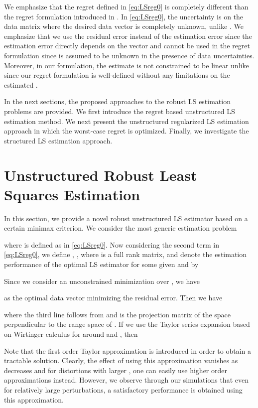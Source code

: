 \documentclass[review,sort&compress]{elsarticle}
\begin{document}
We emphasize that the regret defined in \eqref{eq:LSreg0} is completely different than the regret formulation introduced in \cite{yonina1, yonina3}. In \eqref{eq:LSreg0}, the uncertainty is on the data matrix where the desired data vector  is completely unknown, unlike \cite{yonina1, yonina3}. We emphasize that we use the residual error  instead of the estimation error  since the estimation error directly depends on the vector  and cannot be used in the regret formulation since  is assumed to be unknown in the presence of data uncertainties. Moreover, in our formulation, the estimate  is not constrained to be linear unlike \cite{yonina1, yonina3} since our regret formulation is well-defined without any limitations on the estimated .

In the next sections, the proposed approaches to the robust LS estimation problems are provided. We first introduce the regret based unstructured LS estimation method. We next present the unstructured regularized LS estimation approach in which the worst-case regret is optimized. Finally, we investigate the structured LS estimation approach.

\section{Unstructured Robust Least Squares Estimation} \label{sec:urls}
In this section, we provide a novel robust unstructured LS estimator based on a certain minimax criterion. We consider the most generic estimation problem

where  is defined as in \eqref{eq:LSreg0}. Now considering the second term in \eqref{eq:LSreg0}, we define , , where  is a full rank matrix, and denote the estimation performance of the optimal LS estimator for some given  and  by

Since we consider an unconstrained minimization over , we have \cite{sayedbook}

as the optimal data vector minimizing the residual error. Then we have

where the third line follows from  \cite{sayedbook} and  is the projection matrix of the space perpendicular to the range space of . If we use the Taylor series expansion based on Wirtinger calculus \cite{graham} for  around  and , then

Note that the first order Taylor approximation is introduced in order to obtain a tractable solution. Clearly, the effect of using this approximation vanishes as  decreases and for distortions with larger , one can easily use higher order approximations instead. However, we observe through our simulations that even for relatively large perturbations, a satisfactory performance is obtained using this approximation.
\end{document}
